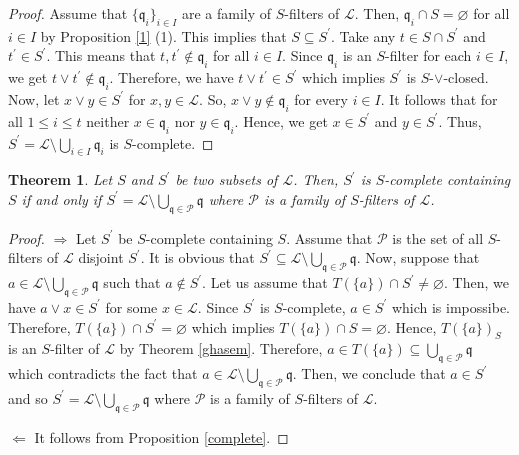 \documentclass[preprint,review,10pt]{amsart}
\newtheorem{theorem}{Theorem}[section]
\theoremstyle{definition}
\theoremstyle{remark}
\numberwithin{equation}{section}
\begin{document}
\begin{proof}
Assume that  $\{\mathfrak{q}_i\}_{i \in I}$ are a family of $S$-filters of $\mathscr{L}$. Then, $\mathfrak{q}_i \cap S= \varnothing$ for all $i \in I$ by Proposition \ref{1} (1). This implies that $S \subseteq S^{\prime}$. Take any $t \in S \cap S^{\prime}$ and $t^{\prime} \in  S^{\prime}$. This means that $t, t^{\prime} \notin  \mathfrak{q}_i$ for all $i \in I$. Since $\mathfrak{q}_i$ is an $S$-filter for each $i \in I$, we get $t \vee t^{\prime} \notin \mathfrak{q}_i$. Therefore, we have $t \vee t^{\prime} \in S^{\prime}$ which implies $S^{\prime}$ is $S$-$\vee$-closed. Now, let $x \vee y \in S^{\prime}$ for   $x,y \in \mathscr{L}$. So, $x \vee y \notin \mathfrak{q}_i$ for every $i \in I$. It follows that for all $1 \leq i \leq t$ neither $x \in \mathfrak{q}_i$ nor $y \in \mathfrak{q}_i$. Hence, we get $x \in S^{\prime}$ and $y \in S^{\prime}$. Thus, $S^{\prime}=\mathscr{L} \setminus \bigcup_{i \in I}  \mathfrak{q}_i$ is $S$-complete.
\end{proof}
\begin{theorem}
Let $S$ and $ S^{\prime}$ be two subsets of $\mathscr{L}$. Then, $S^{\prime}$ is $S$-complete containing $S$ if and only if $S^{\prime}=\mathscr{L} \setminus \bigcup_{\mathfrak{q} \in \mathscr{P}}  \mathfrak{q}$ where  $\mathscr{P}$ is a family of  $S$-filters of $\mathscr{L}$.
\end{theorem}
\begin{proof}
$\Longrightarrow$ Let $S^{\prime}$ be  $S$-complete containing $S$. Assume that $\mathscr{P}$ is the set of all  $S$-filters of $\mathscr{L}$ disjoint $S^{\prime}$. It is obvious that $S^{\prime} \subseteq \mathscr{L} \setminus \bigcup_{\mathfrak{q} \in \mathscr{P}}  \mathfrak{q}$. Now, suppose that  $a \in \mathscr{L} \setminus \bigcup_{\mathfrak{q} \in \mathscr{P}}  \mathfrak{q}$ such that $a \notin S^{\prime}$. Let us assume that $T(\{a\}) \cap S^{\prime} \neq \varnothing$. Then, we have   $a \vee x \in S^{\prime}$ for some $ x \in \mathscr{L}$. Since $S^{\prime}$ is $S$-complete, $a \in S^{\prime}$ which is impossibe. Therefore,  $T(\{a\}) \cap S^{\prime} = \varnothing$ which implies $T(\{a\}) \cap S=\varnothing$. Hence, $T(\{a\})_S$ is an $S$-filter of $\mathscr{L}$ by Theorem \ref{ghasem}. Therefore, $a \in T(\{a\}) \subseteq \bigcup_{\mathfrak{q} \in \mathscr{P}}  \mathfrak{q}$ which  contradicts the  fact that $a \in \mathscr{L} \setminus \bigcup_{\mathfrak{q} \in \mathscr{P}}  \mathfrak{q}$. Then, we conclude that $a \in S^{\prime}$ and so $S^{\prime}=\mathscr{L} \setminus \bigcup_{\mathfrak{q} \in \mathscr{P}}  \mathfrak{q}$ where  $\mathscr{P}$ is a family of  $S$-filters of $\mathscr{L}$.

$\Longleftarrow$ It follows from Proposition \ref{complete}.
\end{proof}
\end{document}
